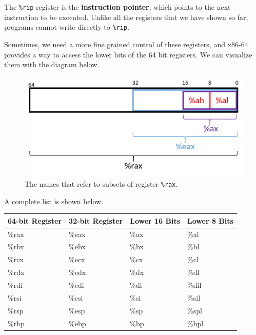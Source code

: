   \begin{definition}
    The \texttt{\%rip} register is the \textbf{instruction pointer}, which points to the next instruction to be executed. Unlike all the registers that we have shown so far, programs cannot write directly to \texttt{\%rip}. 
  \end{definition}

  \begin{definition}
    Sometimes, we need a more fine grained control of these registers, and x86-64 provides a way to access the lower bits of the 64 bit registers. We can visualize them with the diagram below. 
    \begin{figure}[H]
      \centering 
      \includegraphics[scale=0.6]{img/register_subsets.png}
      \caption{The names that refer to subsets of register \texttt{\%rax}.} 
      \label{fig:register_subsets}
    \end{figure}
    A complete list is shown below. 
    \begin{table}[H]
      \centering
      \begin{tabular}{|l|l|l|l|}
      \hline
      \textbf{64-bit Register} & \textbf{32-bit Register} & \textbf{Lower 16 Bits} & \textbf{Lower 8 Bits} \\ \hline
      \%rax & \%eax & \%ax & \%al \\ \hline
      \%rbx & \%ebx & \%bx & \%bl \\ \hline
      \%rcx & \%ecx & \%cx & \%cl \\ \hline
      \%rdx & \%edx & \%dx & \%dl \\ \hline
      \%rdi & \%edi & \%di & \%dil \\ \hline
      \%rsi & \%esi & \%si & \%sil \\ \hline
      \%rsp & \%esp & \%sp & \%spl \\ \hline
      \%rbp & \%ebp & \%bp & \%bpl \\ \hline

\end{tabular}
\end{table}
\end{definition}
